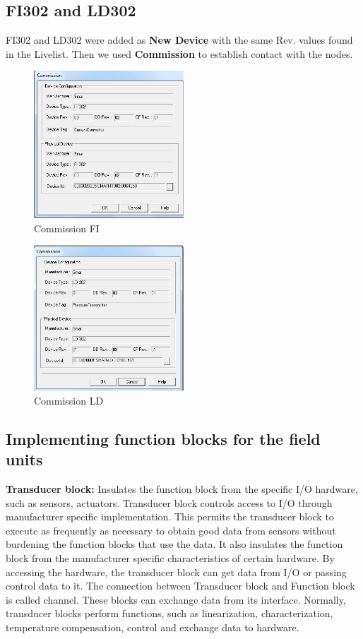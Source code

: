 \newpage
\subsection{FI302 and LD302}
FI302 and LD302 were added as \textbf{New Device} with the same Rev. values found in the Livelist. Then we used \textbf{Commission} to establish contact with the nodes. 

\begin{figure}[!htb]
    \centering
    \includegraphics[width=0.5\textwidth]{images/ComissionFI}
    \caption{Commission FI}
    \end{figure}
    
\begin{figure}[!htb]
    \centering
    \includegraphics[width=0.5\textwidth]{images/CommissionLD}
    \caption{Commission LD}
    \end{figure}

\newpage
\subsection{Implementing function blocks for the field units}
\textbf{Transducer block:} Insulates the function block from the specific I/O hardware, such as sensors, actuators. Transducer block controls access to I/O through manufacturer specific implementation. This permits the transducer block to execute as frequently as necessary to obtain good data from sensors without burdening the function blocks that use the data. It also insulates the function block from the manufacturer specific characteristics of certain hardware. By accessing the hardware, the transducer block can get data from I/O or passing control data to it. The connection between Transducer block and Function block is called channel. These blocks can exchange data from its interface.
Normally, transducer blocks perform functions, such as linearization, characterization, temperature compensation, control and exchange data to hardware.

